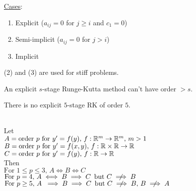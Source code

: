 \underline{Cases}:
\begin{enumerate}[label = (\arabic*)]
    \item Explicit ($a_{ij} = 0$ for $j\geq i$ and $c_1 = 0$)
    \item Semi-implicit ($a_{ij} = 0$ for $j>i$)
    \item Implicit\-\\
\end{enumerate}
\begin{remark}
  (2) and (3) are used for stiff problems.
\end{remark}

\newpage

\begin{theorem}
  An explicit $s$-stage Runge-Kutta method can't have order $> s$.
\end{theorem}

\begin{theorem}
  There is no explicit $5$-stage RK of order $5$.
\end{theorem}

\begin{theorem}\-\\

  Let \\
  
  \-\hspace{0.5cm}$A = \text{order } p \text{ for } y'=f(y), \, f:\mathbb{R}^m \to \mathbb{R}^m, \, m>1$\\
  \-\hspace{0.5cm}$B = \text{order } p \text{ for } y'=f(x,y), \, f:\mathbb{R}\times\mathbb{R} \to \mathbb{R}$\\
  \-\hspace{0.5cm}$C = \text{order } p \text{ for } y'=f(y), \, f:\mathbb{R} \to \mathbb{R}$\\
  
  Then\\
  
  \-\hspace{0.5cm}$\text{For }1\leq p\leq3, \, A\iff B \iff C$ \\
  \-\hspace{0.5cm}$\text{For }p = 4,        \, A\iff B \implies C \, \text{ but } C \centernot\implies B$\\
  \-\hspace{0.5cm}$\text{For }p \geq 5,     \, A\hspace{0.1cm}\implies B \implies C \, \text{ but } C \centernot\implies B, \, B \centernot\implies A$\\
\end{theorem}

